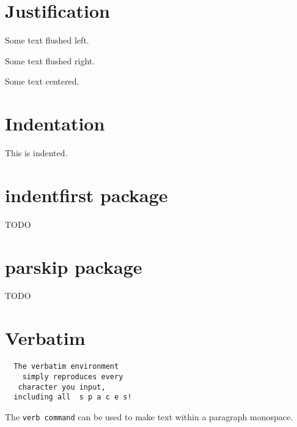 \documentclass{article}
\begin{document}
  \section{Justification}

  \begin{flushleft}Some text flushed left.\end{flushleft}

  \begin{flushright}Some text flushed right.\end{flushright}

  \begin{center}
    Some text centered.
  \end{center}

  \section{Indentation}

  \indent This is indented.

  \section{indentfirst package}
  TODO

  \section{parskip package}
  TODO

  \section{Verbatim}

  \begin{verbatim}
  The verbatim environment
    simply reproduces every
   character you input,
  including all  s p a c e s!
  \end{verbatim}

  The \verb+verb command+ can be used to make text within a paragraph monospace.
\end{document}
